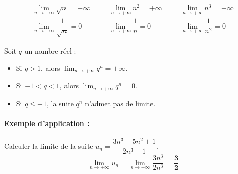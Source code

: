 \documentclass[12pt,a4paper]{article}
\begin{document}
\begin{tcolorbox}[colback=blue!5!white,colframe=myblue,title=\textbf{Théorème 1 : Limites de référence}]
\[
\begin{array}{rcccl}
\lim_{n \to +\infty} \sqrt{n} = +\infty & \quad & \lim_{n \to +\infty} n^2 = +\infty & \quad & \lim_{n \to +\infty} n^3 = +\infty \\[0.3cm]
\lim_{n \to +\infty} \dfrac{1}{\sqrt{n}} = 0 & \quad & \lim_{n \to +\infty} \dfrac{1}{n} = 0 & \quad & \lim_{n \to +\infty} \dfrac{1}{n^2} = 0
\end{array}
\]
\end{tcolorbox}

\begin{tcolorbox}[colback=red!5!white,colframe=myred,title=\textbf{Théorème 2 : Limite de $q^n$}]
Soit $q$ un nombre réel :
\begin{itemize}
    \item Si $q > 1$, alors $\lim_{n \to +\infty} q^n = +\infty$.
    \item Si $-1 < q < 1$, alors $\lim_{n \to +\infty} q^n = 0$.
    \item Si $q \le -1$, la suite $q^n$ n'admet pas de limite.
\end{itemize}
\end{tcolorbox}

\paragraph{Exemple d'application :}
Calculer la limite de la suite $u_n = \dfrac{3n^3 - 5n^2 + 1}{2n^3 + 1}$.
\[
\lim_{n \to +\infty} u_n = \lim_{n \to +\infty} \dfrac{3n^3}{2n^3} = \mathbf{\dfrac{3}{2}}
\]
\end{document}
